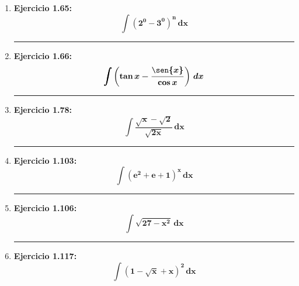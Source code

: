 \documentclass[12pt]{article}
\begin{document}
\begin{enumerate}[label=\textbf{\arabic*)}]
        \hrule %
        \item \textbf{Ejercicio 1.65: } \[\bm{\int (2^0 - 3^0)^n \, dx}\]


        \hrule %
        \item \textbf{Ejercicio 1.66: } \[\bm{\int \left(\tan{x} - \frac{\sen{x}}{\cos{x}}\right) \, dx}\]


        \hrule %
        \item \textbf{Ejercicio 1.78: } \[\bm{\int \frac{\sqrt{x} - \sqrt{2}}{\sqrt{2x}} \, dx}\]


        \hrule %
        \item \textbf{Ejercicio 1.103:} \[\bm{\int (e^2 + e + 1)^x \, dx}\]


        \hrule %
        \item \textbf{Ejercicio 1.106: } \[\bm{\int \sqrt{27 - x^2} \, dx}\]


        \hrule %
        \item \textbf{Ejercicio 1.117: } \[\bm{\int (1 - \sqrt{x} + x)^2 \, dx}\]


    \end{enumerate}
\end{document}
